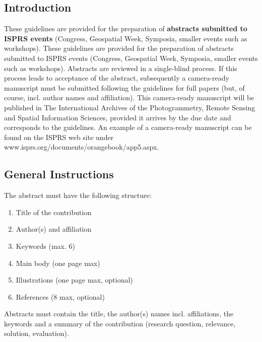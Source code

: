 \documentclass{isprs} %
\begin{document}
\sloppy

\subsection{Introduction}
\label{sec:Introduction}
These guidelines are provided for the preparation of \textbf{abstracts submitted to ISPRS events} (Congress, Geospatial Week, Symposia, smaller events such as workshops). These guidelines are provided for the preparation of abstracts submitted to ISPRS events (Congress, Geospatial Week, Symposia, smaller events such as workshops). Abstracts are reviewed in a single-blind process. If this process leads to acceptance of the abstract, subsequently a camera-ready manuscript must be submitted following the guidelines for full papers (but, of course, incl. author names and affiliation). This camera-ready manuscript will be published in The International Archives of the Photogrammetry, Remote Sensing and Spatial Information Sciences, provided it arrives by the due date and corresponds to the guidelines.
An example of a camera-ready manuscript can be found on the ISPRS web site under www.isprs.org/documents/orangebook/app5.aspx.

\subsection{General Instructions}\label{sec:General Instructions}

The abstract must have the following structure:

\begin{enumerate}
\setlength\itemsep{0em}\setlength\parskip{0em}\setlength\topsep{0em}\setlength\partopsep{0em}\setlength\parsep{0em}
\item{Title of the contribution}
\item{Author(s) and affiliation}
\item{Keywords (max. 6)}
\item{Main body (one page max)}
\item{Illustrations (one page max, optional)}
\item{References (8 max, optional)}
\end{enumerate}

Abstracts must contain the title, the author(s) names incl. affiliations, the keywords and a summary of the contribution (research question, relevance, solution, evaluation).
\end{document}
